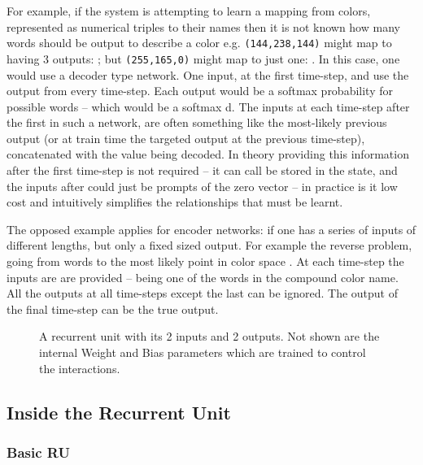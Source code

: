 \documentclass[12pt,parskip]{komatufte}
\begin{document}
For example, if the system is attempting to learn a mapping from colors, represented as numerical triples to their names then it is not known how many words should be output to describe a color e.g. \texttt{(144,238,144)} might map to having 3 outputs: ; but \texttt{(255,165,0)} might map to just one:  .
In this case, one would use a decoder type network.
One input, at the first time-step, and use the output from every time-step.
Each output would be a softmax probability for possible words -- which would be a softmax d.
The inputs at each time-step after the first in such a network, are often something like the most-likely previous output (or at train time the targeted output at the previous time-step), concatenated with the value being decoded.
In theory providing this information after the first time-step is not required -- it can call be stored in the state, and the inputs after could just be prompts of the zero vector -- in practice is it low cost and intuitively simplifies the relationships that must be learnt.

The opposed example applies for encoder networks:
if one has a series of inputs of different lengths,
but only a fixed sized output.
For example the reverse problem, going from words to the most likely point in color space .
At each time-step the inputs are are provided -- being one of the words in the compound color name.
All the outputs at all time-steps except the last can be ignored.
The output of the final time-step can be the true output.



\begin{figure}
	\caption{A recurrent unit with its 2 inputs and 2 outputs. Not shown are the internal Weight and Bias parameters which are trained to control the interactions.}	
	
	\label{fig-ru}
	
	
\end{figure}


\subsection{Inside the Recurrent Unit}


\subsubsection{Basic RU}
\end{document}
